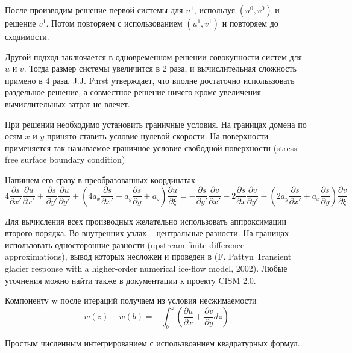 После производим решение первой системы для $u^1$, используя
$(u^0, v^0)$ и решение $v^1$. Потом повторяем с использованием
$(u^1, v^1)$ и повторяем до сходимости.

Другой подход заключается в одновременном решении совокупности
систем для $u$ и $v$. Тогда размер системы увеличится в 2 раза, и
вычислительная сложность примено в 4 раза. J.J. Furst утверждает,
что вполне достаточно исполььзовать раздельное решение, а совместное
решение ничего кроме увеличения вычислительных затрат не влечет.

При решении необходимо установить граничные условия. На границах домена
по осям $x$ и $y$ принято ставить условие нулевой скорости.
На поверхности применяется так называемое граничное условие свободной
поверхности (stress-free surface boundary condition)

Напишем его сразу в преобразованных координатах
\begin{equation*}
    4
    \frac
    {\partial s}
    {\partial x'}
    \frac
    {\partial u}
    {\partial x'}
    +
    \frac
    {\partial s}
    {\partial y'}
    \frac
    {\partial u}
    {\partial y'}
    +
    \left(
    4
    a_x
    \frac
    {\partial s}
    {\partial x'}
    +
    a_y
    \frac
    {\partial s}
    {\partial y}
    +
    a_z
    \right)
    \frac
    {\partial u}
    {\partial \xi}
    =
    -
    \frac
    {\partial s}
    {\partial y'}
    \frac
    {\partial v}
    {\partial x'}
    -
    2
    \frac
    {\partial s}
    {\partial x}
    \frac
    {\partial v}
    {\partial y'}
    -
    \left(
    2
    a_y
    \frac
    {\partial s}
    {\partial x'}
    +
    a_x
    \frac
    {\partial s}
    {\partial y}
    \right)
    \frac
    {\partial v}
    {\partial \xi}
\end{equation*}

Для вычисления всех производных желательно использовать аппроксимации
второго порядка. Во внутренних узлах -- центральные разности. На
границах использовать односторонние разности (upstream finite-difference
approximations), вывод которых несложен и проведен в (F. Pattyn Transient glacier response with a higher-order numerical
ice-flow model, 2002). Любые уточнения можно найти также в документации
к проекту CISM 2.0.

Компоненту w после итераций получаем из условия несжимаемости
\begin{equation*}
    w(z)
    -
    w(b)
    =
    -
    \int_{b}^{z}
    \left(
    \frac
    {\partial u}
    {\partial x}
    +
    \frac
    {\partial v}
    {\partial y}
    dz
    \right)
\end{equation*}

Простым численным интегрированием с использвоанием квадратурных
формул.
